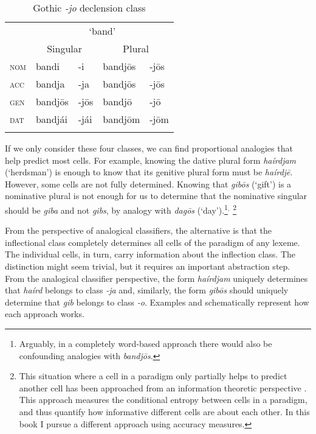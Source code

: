 \begin{table}[t]
  \centering
  \caption{Gothic \textit{-jo} declension class}\label{tab:jo-class-gothic}
  \begin{tabular}{lllll}
    \lsptoprule
        & \multicolumn{4}{c}{`band'}                                \\
        & \multicolumn{2}{c}{Singular} & \multicolumn{2}{c}{Plural} \\
    \midrule
    \textsc{nom} & bandi                        & -i   & bandjōs & -jōs      \\
    \textsc{acc} & bandja                       & -ja  & bandjōs & -jōs      \\
    \textsc{gen} & bandjōs                      & -jōs & bandjō  & -jō       \\
    \textsc{dat} & bandjái                      & -jái & bandjōm & -jōm      \\
    \lspbottomrule
  \end{tabular}
\end{table}

If we only consider these four classes, we can find proportional analogies that help predict most cells. For example, knowing the dative plural form \textit{haírdjam} (`herdsman') is enough to know that its genitive plural form must be \textit{haírdjē}. However, some cells are not fully determined. Knowing that \textit{gibōs} (`gift') is a nominative plural is not enough for us to determine that the nominative singular should be \textit{giba} and not \textit{gibs}, by analogy with \textit{dagōs} (`day').\footnote{Arguably, in a completely word-based approach there would also be confounding analogies with \textit{bandjōs}.}$^{,}$ \footnote{This situation where a cell in a paradigm only partially helps to predict another cell has been approached from an information theoretic perspective \autocite{MoscosodelPradoMartin.2004a, Ackerman.2013a, Blevins.2013, Ackerman.2016, Bonami.2016}. This approach measures the conditional entropy between cells in a paradigm, and thus quantify how informative different cells are about each other. In this book I pursue a different approach using accuracy measures.}

From the perspective of analogical classifiers, the alternative is that the inflectional class completely determines all cells of the paradigm of any lexeme. The individual cells, in turn, carry information about the inflection class. The distinction might seem trivial, but it requires an important abstraction step. From the analogical classifier perspective, the form \textit{haírdjam} uniquely determines that \textit{haírd} belongs to class \textit{-ja} and, similarly, the form \textit{gibōs} should uniquely determine that \textit{gib} belongs to class \textit{-o}. Examples  and  schematically represent how each approach works.

